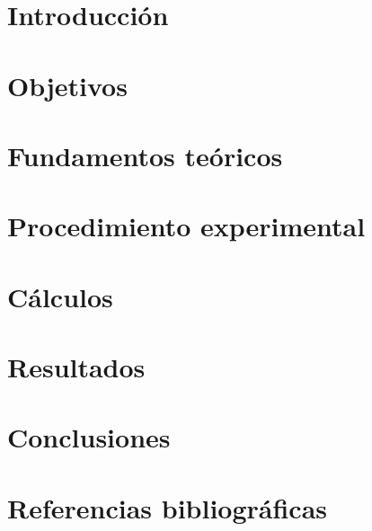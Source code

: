 \documentclass[12pt, a4paper]{article}
\begin{document}


\pagestyle{fancy}
\fancyfoot{} %
\fancyfoot[R]{\thepage}

\tableofcontents
\clearpage

\section{Introducción}


\section{Objetivos}


\section{Fundamentos teóricos}


\section{Procedimiento experimental}


\section{Cálculos}


\section{Resultados}


\section{Conclusiones}


\section{Referencias bibliográficas}
\printbibliography[heading=none]

\clearpage

\listoffigures
\listoftables
\end{document}
